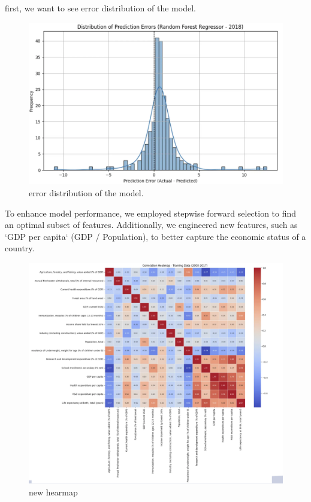 \documentclass{article}
\begin{document}
first, we want to see error distribution of the model.

\begin{figure}[h]
    \centering
    \includegraphics[width=0.8\columnwidth]{./pic/T1.c.1.png} %
    \caption{error distribution of the model.}
    \label{fig:correlation_heatmap}
\end{figure}


To enhance model performance, we employed stepwise forward selection to find an optimal subset of features. Additionally, we engineered new features, such as `GDP per capita` (GDP / Population), to better capture the economic status of a country.

\begin{figure}[h]
    \centering
    \includegraphics[width=0.8\columnwidth]{./pic/T1.c.2.png} %
    \caption{new hearmap}
    \label{fig:correlation_heatmap}
\end{figure}
\end{document}
